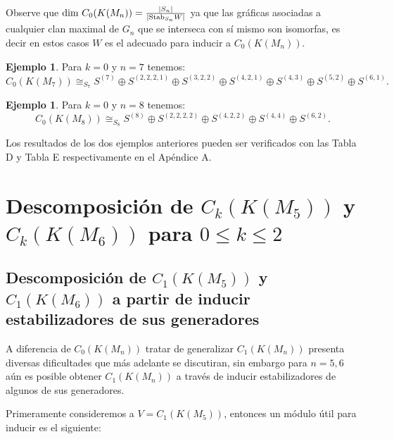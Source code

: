 \documentclass[12pt]{book}
\theoremstyle{definition}
\newtheorem{example}[theorem]{Ejemplo}
\newcounter{in}
\begin{document}
Observe que $\textup{dim } C_{0}(K(M_n)) = \frac{|S_{n}|}{|\textup{Stab}_{S_{n}} W|}$ ya que las gráficas asociadas a cualquier clan maximal de $G_{n}$ que se interseca con sí mismo son isomorfas, es decir en estos casos $W$ es el adecuado para inducir a $C_{0}(K(M_n))$. 

\begin{example}
Para $k =0$ y $n = 7$ tenemos:
\begin{equation}
C_{0}(K(M_{7})) \cong_{S_{7}}  S^{(7)} \oplus S^{(2,2,2,1)} \oplus S^{(3,2,2)} \oplus S^{(4,2,1)} \oplus S^{(4,3)} \oplus S^{(5,2)} \oplus S^{(6,1)}.
\end{equation}
\end{example}
\begin{example}
Para $k =0$ y $n = 8$ tenemos:
\begin{equation}
C_{0}(K(M_{8})) \cong_{S_{8}}  S^{(8)} \oplus S^{(2,2,2,2)} \oplus S^{(4,2,2)} \oplus S^{(4,4)} \oplus S^{(6,2)}.
\end{equation}
\end{example}
Los resultados de los dos ejemplos anteriores pueden ser verificados con las Tabla D y Tabla E respectivamente en el Apéndice A.

\section{Descomposición de $C_{k}(K(M_5))$ y $C_{k}(K(M_6))$ para $0 \leq k \leq 2$}
\subsection{Descomposición de $C_{1}(K(M_5))$ y $C_{1}(K(M_6))$ a partir de inducir estabilizadores de sus generadores}
\label{Ind_est_o_1}

A diferencia de $C_{0}(K(M_n))$ tratar de generalizar $C_{1}(K(M_n))$ presenta diversas dificultades que más adelante se discutiran, sin embargo para $n = 5, 6$ aún es posible obtener $C_{1}(K(M_n))$ a través de inducir estabilizadores de algunos de sus generadores.

Primeramente consideremos a $V = C_{1}(K(M_5))$, entonces un módulo útil para inducir es el siguiente:
\end{document}
